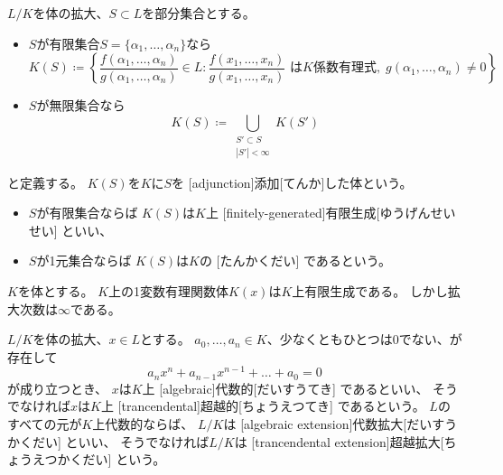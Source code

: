 \documentclass[report]{jlreq}
\begin{document}
\begin{definition}[添加]
    $L/K$を体の拡大、$S \subset L$を部分集合とする。
    \begin{itemize}
        \item $S$が有限集合$S = \{\alpha_1, \dots, \alpha_n\}$なら
            \begin{equation}
                K(S) \coloneqq \left\{
                    \frac{f(\alpha_1, \dots, \alpha_n)}{g(\alpha_1, \dots, \alpha_n)} \in L
                    \colon
                    \frac{f(x_1, \dots, x_n)}{g(x_1, \dots, x_n)} \text{ は$K$係数有理式},\;
                    g(\alpha_1, \dots, \alpha_n) \neq 0
                \right\}
            \end{equation}
        \item $S$が無限集合なら
            \begin{equation}
                K(S) \coloneqq \bigcup_{\substack{S' \subset S \\ |S'| < \infty}} K(S')
            \end{equation}
    \end{itemize}
    と定義する。
    $K(S)$を$K$に$S$を
    [adjunction]{添加}[てんか]した体という。
    \begin{itemize}
        \item $S$が有限集合ならば
            $K(S)$は$K$上
            [finitely-generated]{有限生成}[ゆうげんせいせい]
            といい、
        \item $S$が1元集合ならば
            $K(S)$は$K$の
            [たんかくだい]
            であるという。
    \end{itemize}
\end{definition}

\begin{example}[有限生成だが有限次拡大でない例]
    $K$を体とする。
    $K$上の1変数有理関数体$K(x)$は$K$上有限生成である。
    しかし拡大次数は$\infty$である。
\end{example}

\begin{definition}[代数拡大と超越拡大]
    $L/K$を体の拡大、$x \in L$とする。
    $a_0, \dots, a_n \in K$、少なくともひとつは$0$でない、が存在して
    \begin{equation}
        a_n x^n + a_{n-1} x^{n-1} + \dots + a_0 = 0
    \end{equation}
    が成り立つとき、
    $x$は$K$上
    [algebraic]{代数的}[だいすうてき]
    であるといい、
    そうでなければ$x$は$K$上
    [trancendental]{超越的}[ちょうえつてき]
    であるという。
    $L$のすべての元が$K$上代数的ならば、
    $L/K$は
    [algebraic extension]{代数拡大}[だいすうかくだい]
    といい、
    そうでなければ$L/K$は
    [trancendental extension]{超越拡大}[ちょうえつかくだい]
    という。
\end{definition}
\end{document}

